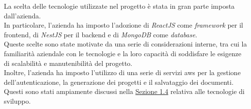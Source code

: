 
La scelta delle tecnologie utilizzate nel progetto è stata in gran parte imposta dall'azienda.\\
In particolare, l'azienda ha imposto l'adozione di \textit{ReactJS} come \textit{framework} per il \gls{frontend}, di \textit{NestJS} per il \gls{backend} e di \textit{MongoDB} come \textit{database}.\\
Queste scelte sono state motivate da una serie di considerazioni interne, tra cui la familiarità aziendale con le tecnologie e la loro capacità di soddisfare le esigenze di scalabilità e manutenibilità del progetto.\\

\noindent Inoltre, l'azienda ha imposto l'utilizzo di una serie di servizi \gls{aws} per la gestione dell'autenticazione, la generazione dei progetti e il salvataggio dei documenti.\\
Questi sono stati ampiamente discussi nella {\hyperref[sez:tecnologie-sviluppo]{Sezione 1.4}} relativa alle tecnologie di sviluppo.
